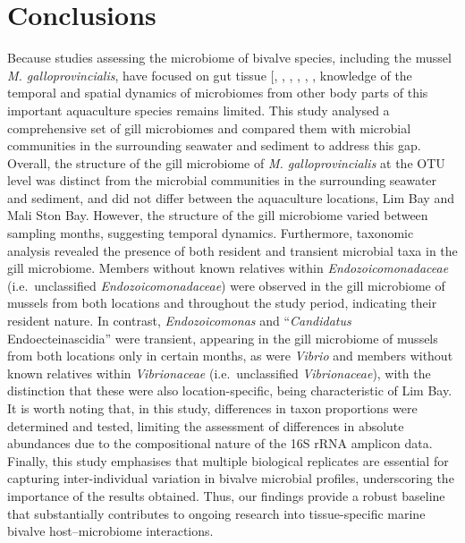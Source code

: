 \documentclass[
  12 pt,
]{article}
\begin{document}
\section{Conclusions}\label{conclusions}

Because studies assessing the microbiome of bivalve species, including the mussel \emph{M. galloprovincialis}, have focused on gut tissue {[}, , , , , \citeproc{ref-Wathsala2021}{30}{]}, knowledge of the temporal and spatial dynamics of microbiomes from other body parts of this important aquaculture species remains limited. This study analysed a comprehensive set of gill microbiomes and compared them with microbial communities in the surrounding seawater and sediment to address this gap. Overall, the structure of the gill microbiome of \emph{M. galloprovincialis} at the OTU level was distinct from the microbial communities in the surrounding seawater and sediment, and did not differ between the aquaculture locations, Lim Bay and Mali Ston Bay. However, the structure of the gill microbiome varied between sampling months, suggesting temporal dynamics. Furthermore, taxonomic analysis revealed the presence of both resident and transient microbial taxa in the gill microbiome. Members without known relatives within \emph{Endozoicomonadaceae} (i.e.~unclassified \emph{Endozoicomonadaceae}) were observed in the gill microbiome of mussels from both locations and throughout the study period, indicating their resident nature. In contrast, \emph{Endozoicomonas} and ``\emph{Candidatus} Endoecteinascidia'' were transient, appearing in the gill microbiome of mussels from both locations only in certain months, as were \emph{Vibrio} and members without known relatives within \emph{Vibrionaceae} (i.e.~unclassified \emph{Vibrionaceae}), with the distinction that these were also location-specific, being characteristic of Lim Bay. It is worth noting that, in this study, differences in taxon proportions were determined and tested, limiting the assessment of differences in absolute abundances due to the compositional nature of the 16S rRNA amplicon data. Finally, this study emphasises that multiple biological replicates are essential for capturing inter-individual variation in bivalve microbial profiles, underscoring the importance of the results obtained. Thus, our findings provide a robust baseline that substantially contributes to ongoing research into tissue-specific marine bivalve host--microbiome interactions.
\newpage
\end{document}
